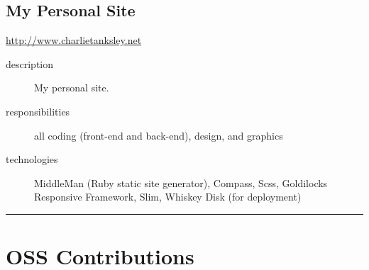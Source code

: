 \documentclass{article}
\begin{document}
\subsection{My Personal Site} %
\label{sub:My Personal Site}

\begin{multicols}{2}
\href{http://www.charlietanksley.net}{http://www.charlietanksley.net}

\begin{description}
  \item[description] My personal site. 
  \item[responsibilities] all coding (front-end and back-end), design, and graphics 
  \item[technologies] MiddleMan (Ruby static site generator), Compass, Scss, Goldilocks Responsive Framework, Slim, Whiskey Disk (for deployment)
\end{description}

\vfill
\columnbreak
{}
\end{multicols}


\hrule
\section{OSS Contributions} %
\label{sec:OSS Contributions}
\end{document}
